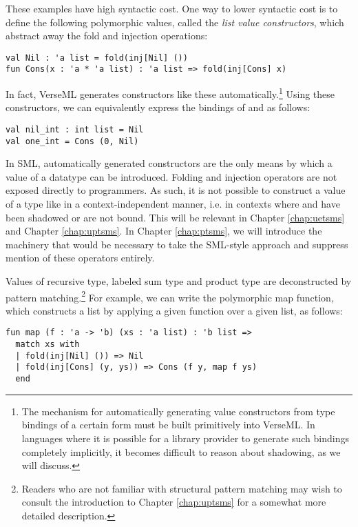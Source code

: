 These examples have high syntactic cost. 
One way to lower syntactic cost is to define the following polymorphic values, called the \emph{list value constructors}, which abstract away the fold and injection operations:
\begin{lstlisting}[numbers=none]
val Nil : 'a list = fold(inj[Nil] ())
fun Cons(x : 'a * 'a list) : 'a list => fold(inj[Cons] x)
\end{lstlisting}
In fact, VerseML generates constructors like these automatically.\footnote{The mechanism for automatically generating value constructors from type bindings of a certain form must be built primitively into VerseML. In languages where it is possible for a library provider to generate such bindings completely implicitly, it becomes difficult to reason about shadowing, as we will discuss.}
Using these constructors, we can equivalently express the bindings of  and  as follows:
\begin{lstlisting}[numbers=none]
val nil_int : int list = Nil
val one_int = Cons (0, Nil)
\end{lstlisting}

In SML, automatically generated constructors are the only means by which a value of a datatype can be introduced. Folding and injection operators are not exposed directly to programmers. As such, it is not possible to construct a value of a type like  in a context-independent manner, i.e. in contexts where  and  have been shadowed or are not bound. This will be relevant in Chapter \ref{chap:uetsms} and Chapter \ref{chap:uptsms}. In Chapter \ref{chap:ptsms}, we will introduce the machinery that would be necessary to take the SML-style approach and suppress mention of these operators entirely.

Values of recursive type, labeled sum type and product type are deconstructed by pattern matching.\footnote{Readers who are not familiar with structural pattern matching may wish to consult the introduction to Chapter \ref{chap:uptsms} for a somewhat more detailed description.} For example, we can write the polymorphic map function, which constructs a  list by applying a given function over a given list, as follows:
\begin{lstlisting}[numbers=none]
fun map (f : 'a -> 'b) (xs : 'a list) : 'b list => 
  match xs with 
  | fold(inj[Nil] ()) => Nil
  | fold(inj[Cons] (y, ys)) => Cons (f y, map f ys)
  end
\end{lstlisting}



